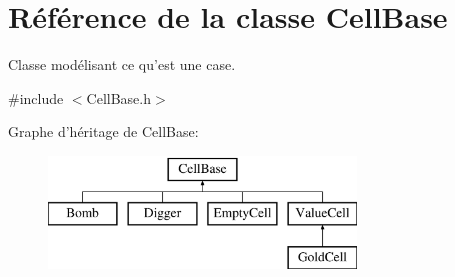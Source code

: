\hypertarget{class_cell_base}{\section{Référence de la classe Cell\-Base}
\label{class_cell_base}
}


Classe modélisant ce qu'est une case.  




{\ttfamily \#include $<$Cell\-Base.\-h$>$}

Graphe d'héritage de Cell\-Base\-:\begin{figure}[H]
\begin{center}
\leavevmode
\includegraphics[height=3.000000cm]{class_cell_base}
\end{center}
\end{figure}
